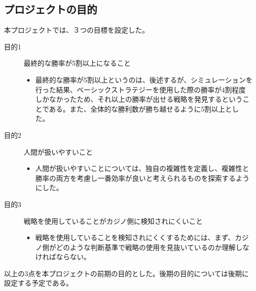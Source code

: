 \subsection{プロジェクトの目的}
本プロジェクトでは、３つの目標を設定した。
\begin{description}
\item[目的1] 最終的な勝率が5割以上になること
\begin{itemize}
\item{最終的な勝率が5割以上というのは、後述するが、シミュレーションを行った結果、ベーシックストラテジーを使用した際の勝率が4割程度しかなかったため、それ以上の勝率が出せる戦略を発見するということである。また、全体的な勝利数が勝ち越せるように5割以上とした。}
\end{itemize}
\item[目的2]人間が扱いやすいこと
\begin{itemize}
\item{人間が扱いやすいことについては、独自の複雑性を定義し、複雑性と勝率の両方を考慮し一番効率が良いと考えられるものを探索するようにした。}
\end{itemize}
\item[目的3]戦略を使用していることがカジノ側に検知されにくいこと
\begin{itemize}
\item{戦略を使用していることを検知されにくくするためには、まず、カジノ側がどのような判断基準で戦略の使用を見抜いているのか理解しなければならない。}
\end{itemize}
\end{description}
以上の3点を本プロジェクトの前期の目的とした。後期の目的については後期に設定する予定である。
